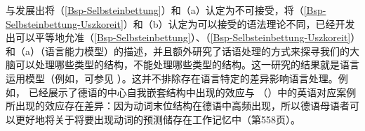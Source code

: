 与发展出将（\ref{Bsp-Selbsteinbettung}）和（a）认定为不可接受，将（\ref{Bsp-Selbsteinbettung-Uszkoreit}）和（b）认定为可以接受的语法理论不同，已经开发出可以平等地允准（\ref{Bsp-Selbsteinbettung}）、（\ref{Bsp-Selbsteinbettung-Uszkoreit}）和（a）（语言能力模型）的描述，并且额外研究了话语处理的方式来探寻我们的大脑可以处理哪些类型的结构，不能处理哪些类型的结构。这一研究的结果就是语言运用模型（例如，可参见 ）。这并不排除存在语言特定的差异影响语言处理。例如， \citet*{VSLK2010a}已经展示了德语的中心自我嵌套结构中出现的效应与 （）中的英语对应案例所出现的效应存在差异：因为动词末位结构在德语中高频出现，所以德语母语者可以更好地将关于将要出现动词的预测储存在工作记忆中（第558页）。

